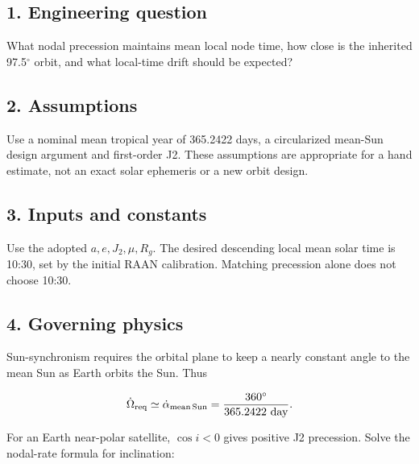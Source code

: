 \documentclass[10pt,a4paper]{article}
\numberwithin{equation}{section}
\begin{document}
\subsection*{1. Engineering question}
\begin{sloppypar}What nodal precession maintains mean local node time, how close is the inherited 97.5\ensuremath{{}^{\circ}} orbit, and what local-time drift should be expected?\end{sloppypar}


\subsection*{2. Assumptions}
\begin{sloppypar}Use a nominal mean tropical year of 365.2422 days, a circularized mean-Sun design argument and first-order J2. These assumptions are appropriate for a hand estimate, not an exact solar ephemeris or a new orbit design.\end{sloppypar}


\subsection*{3. Inputs and constants}
\begin{sloppypar}Use the adopted \(a,e,J_2,\mu,R_g\). The desired descending local mean solar time is 10:30, set by the initial RAAN calibration. Matching precession alone does not choose 10:30.\end{sloppypar}


\subsection*{4. Governing physics}
\begin{sloppypar}Sun-synchronism requires the orbital plane to keep a nearly constant angle to the mean Sun as Earth orbits the Sun. Thus\end{sloppypar}


\begin{equation}\dot\Omega_{\rm req}\simeq\dot\alpha_{\rm mean\,Sun}
=\frac{360^\circ}{365.2422\ {\rm day}}.\label{eq:ch4-1}\end{equation}

\begin{sloppypar}For an Earth near-polar satellite, \(\cos i<0\) gives positive J2 precession. Solve the nodal-rate formula for inclination:\end{sloppypar}
\end{document}
